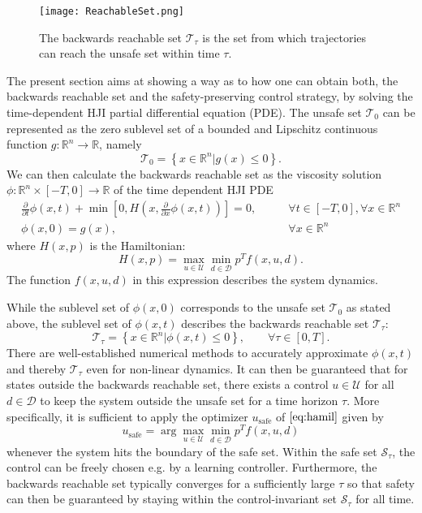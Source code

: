 \documentclass[../main.tex]{subfiles}
\begin{document}
\begin{figure}
    \centering
    \texttt{[image: ReachableSet.png]}
        \caption{The backwards reachable set $\mathcal{T}_\tau$ is the set from which trajectories can reach the unsafe set within time $\tau$.}    
    \label{fig:reachable}
\end{figure}
The present section aims at showing a way as to how one can obtain both, the backwards reachable set and the safety-preserving control strategy, by solving the time-dependent HJI partial differential equation (PDE). The unsafe set $\mathcal{T}_0$ can be represented as the zero sublevel set of a bounded and Lipschitz continuous function $g: \mathbb{R}^n \rightarrow \mathbb{R}$, namely
\begin{equation}
    \mathcal{T}_0 = \left\{ x \in \mathbb{R}^n | g(x) \leq 0 \right \}. 
\end{equation}
We can then calculate the backwards reachable set as the viscosity solution \mbox{$\phi: \mathbb{R}^n \times [-T, 0] \rightarrow \mathbb{R}$} of the time dependent HJI PDE
\begin{align}
    \frac{\partial}{\partial t} \phi(x,t) + \min\left[0, H\left(x,\frac{\partial}{\partial x} \phi(x,t)\right)\right] = 0, \qquad &\forall t \in [-T, 0], \forall x \in \mathbb{R}^n\\
    \phi(x,0) = g(x), \qquad &\forall x \in \mathbb{R}^n
\end{align}
where $H(x,p)$ is the Hamiltonian: 
\begin{equation}\label{eq:hamil}
    H(x,p) = \max_{u \in \mathcal{U}} \min_{d \in \mathcal{D}} p^T f(x,u,d).
\end{equation}
The function $f(x,u,d)$ in this expression describes the system dynamics.

While the sublevel set of $\phi(x,0)$ corresponds to the unsafe set $\mathcal{T}_0$ as stated above, the sublevel set of $\phi(x,t)$ describes the backwards reachable set $\mathcal{T}_\tau$:
\begin{equation}
    \mathcal{T}_\tau = \left\{ x \in \mathbb{R}^n | \phi(x,t) \leq 0 \right \}, \qquad \forall \tau \in [0,T].
\end{equation}
There are well-established numerical methods to accurately approximate $\phi(x,t)$ and thereby $\mathcal{T}_\tau$ even for non-linear dynamics. It can then be guaranteed that for states outside the backwards reachable set, there exists a control $u \in \mathcal{U}$ for all $d \in \mathcal{D}$ to keep the system outside the unsafe set for a time horizon $\tau$. More specifically, it is sufficient to apply the optimizer $u_{\text{safe}}$ of $\eqref{eq:hamil}$ given by
\begin{equation}
    u_{\text{safe}} = \arg \max_{u \in \mathcal{U}} \min_{d \in \mathcal{D}} p^T f(x,u,d)
\end{equation}
whenever the system hits the boundary of the safe set. Within the safe set $\mathcal{S}_\tau$, the control can be freely chosen e.g. by a learning controller. 
Furthermore, the backwards reachable set typically converges for a sufficiently large $\tau$ so that safety can then be guaranteed by staying within the control-invariant set $\mathcal{S}_\tau$ for all time. 
\end{document}
